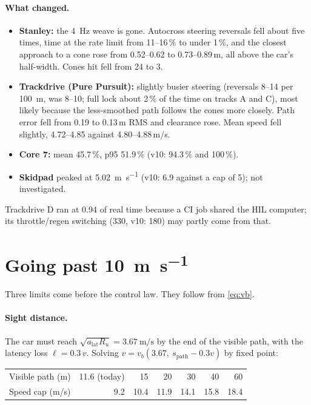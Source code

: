 \documentclass[11pt,a4paper]{article}
\begin{document}
\paragraph{What changed.}
\begin{itemize}
\item \textbf{Stanley:} the \SI{4}{\hertz} weave is gone. Autocross steering reversals fell
about five times, time at the rate limit from 11--16\,\% to under 1\,\%, and the closest
approach to a cone rose from 0.52--0.62 to 0.73--0.89\,m, all above the car's half-width.
Cones hit fell from 24 to 3.
\item \textbf{Trackdrive (Pure Pursuit):} slightly busier steering (reversals 8--14 per
\SI{100}{\metre}, was 8--10; full lock about 2\,\% of the time on tracks A and C), most likely
because the less-smoothed path follows the cones more closely. Path error fell from 0.19 to
0.13\,m RMS and clearance rose. Mean speed fell slightly, 4.72--4.85 against
4.80--4.88\,m/s.
\item \textbf{Core 7:} mean 45.7\,\%, p95 51.9\,\% (v10: 94.3\,\% and 100\,\%).
\item \textbf{Skidpad} peaked at \SI{5.02}{\metre\per\second} (v10: 6.9 against a cap of 5);
not investigated.
\end{itemize}
Trackdrive D ran at 0.94 of real time because a CI job shared the HIL computer; its
throttle/regen switching (330, v10: 180) may partly come from that.

\section{Going past \SI{10}{\metre\per\second}}
Three limits come before the control law. They follow from \cref{eq:vb}.

\paragraph{Sight distance.} The car must reach $\sqrt{a_{\text{lat}} R_u} =
\SI{3.67}{\metre\per\second}$ by the end of the visible path, with the latency loss
$\ell = 0.3\,v$. Solving $v = v_b(3.67,\ s_{\text{path}} - 0.3 v)$ by fixed point:

\begin{center}\small
\begin{tabular}{@{}lrrrrrr@{}}
\toprule
Visible path (m) & 11.6 (today) & 15 & 20 & 30 & 40 & 60 \\
Speed cap (m/s) & 9.2 & 10.4 & 11.9 & 14.1 & 15.8 & 18.4 \\
\bottomrule
\end{tabular}
\end{center}
\end{document}
